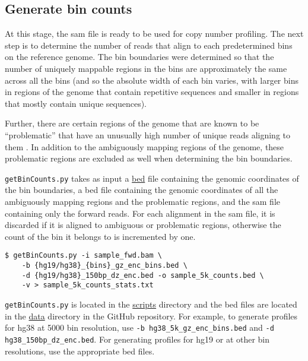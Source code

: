 \documentclass[11pt]{article}
\newcommand{\prog}[1]{\texttt{#1}}
\begin{document}
\subsection{Generate bin counts}
At this stage, the sam file is ready to be used for copy number
profiling.  The next step is to determine the number of reads that align
to each predetermined bins on the reference genome.
The bin boundaries were determined so that the number of uniquely
mappable regions in the bins are approximately the same across all the
bins (and so the absolute width of each bin varies, with larger bins in
regions of the genome that contain repetitive sequences and smaller in
regions that mostly contain unique sequences).

Further, there are certain regions of the genome that are known to be
``problematic'' that have an unusually high number of unique reads
aligning to them \citep{amemiya2019encode}. In addition to the ambiguously
mapping regions of the genome, these problematic regions are excluded as
well when determining the bin boundaries.

%
\prog{getBinCounts.py} takes as input a
\href{https://genome.ucsc.edu/FAQ/FAQformat.html#format1}{bed} file
containing the genomic coordinates of the bin boundaries, a bed file
containing the genomic coordinates of all the ambiguously mapping
regions and the problematic regions, and the sam file containing only
the forward reads. For each alignment in the sam file, it is discarded
if it is aligned to ambiguous or problematic regions, otherwise the
count of the bin it belongs to is incremented by one.
\begin{verbatim}
$ getBinCounts.py -i sample_fwd.bam \ 
    -b {hg19/hg38}_{bins}_gz_enc_bins.bed \
    -d {hg19/hg38}_150bp_dz_enc.bed -o sample_5k_counts.bed \
    -v > sample_5k_counts_stats.txt
\end{verbatim}

\prog{getBinCounts.py} is located in the
\href{https://github.com/rishvanth-kp/cna_utils/tree/master/scripts}{scripts}
directory and the bed files are located in the
\href{https://github.com/rishvanth-kp/cna_utils/tree/master/data}{data}
directory in the GitHub repository. 
%
For example, to generate profiles for hg38 at 5000 bin resolution, use
\prog{-b hg38\_5k\_gz\_enc\_bins.bed} and 
\prog{-d hg38\_150bp\_dz\_enc.bed}.
%
For generating profiles for hg19 or at other bin resolutions, use
the appropriate bed files.
\end{document}
